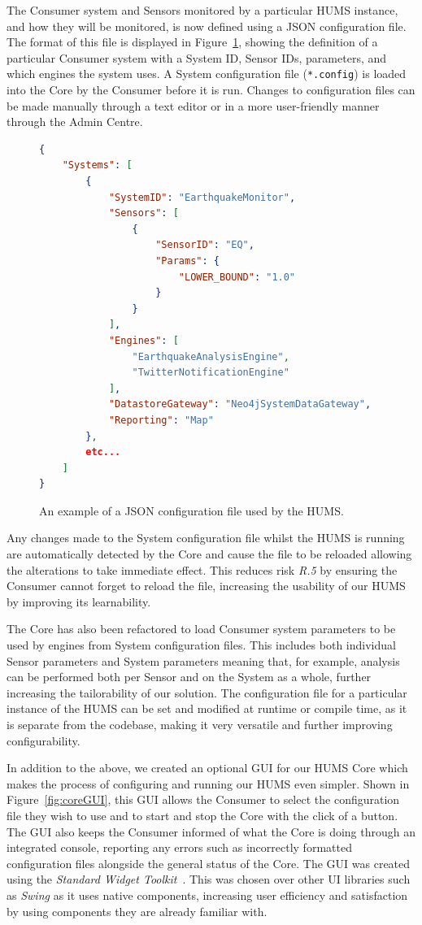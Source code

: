 \documentclass[10pt,a4paper]{article}
\begin{document}
The Consumer system and Sensors monitored by a particular HUMS instance, and how they will be monitored, is now defined using a JSON configuration file. The format of this file is displayed in Figure~\ref{fig:configFiles}, showing the definition of a particular Consumer system with a System ID, Sensor IDs, parameters, and which engines the system uses. A System configuration file (\texttt{*.config}) is loaded into the Core by the Consumer before it is run. Changes to configuration files can be made manually through a text editor or in a more user-friendly manner through the Admin Centre.

\begin{figure}[tbp]
\begin{lstlisting}[language=json,firstnumber=1]
{
    "Systems": [
        {
            "SystemID": "EarthquakeMonitor",
            "Sensors": [
                {
                    "SensorID": "EQ",
                    "Params": {
                        "LOWER_BOUND": "1.0"
                    }
                }
            ],
            "Engines": [
                "EarthquakeAnalysisEngine",
                "TwitterNotificationEngine"
            ],
            "DatastoreGateway": "Neo4jSystemDataGateway",
            "Reporting": "Map"
        },
        etc...
    ]
}
\end{lstlisting}
\caption{An example of a JSON configuration file used by the HUMS.}
\label{fig:configFiles}
\end{figure}

Any changes made to the System configuration file whilst the HUMS is running are automatically detected by the Core and cause the file to be reloaded allowing the alterations to take immediate effect. This reduces risk \emph{R.5} by ensuring the Consumer cannot forget to reload the file, increasing the usability of our HUMS by improving its learnability.

The Core has also been refactored to load Consumer system parameters to be used by engines from System configuration files. This includes both individual Sensor parameters and System parameters meaning that, for example, analysis can be performed both per Sensor and on the System as a whole, further increasing the tailorability of our solution. The configuration file for a particular instance of the HUMS can be set and modified at runtime or compile time, as it is separate from the codebase, making it very versatile and further improving configurability. 

In addition to the above, we created an optional GUI for our HUMS Core which makes the process of configuring and running our HUMS even simpler. Shown in Figure~\ref{fig:coreGUI}, this GUI allows the Consumer to select the configuration file they wish to use and to start and stop the Core with the click of a button. The GUI also keeps the Consumer informed of what the Core is doing through an integrated console, reporting any errors such as incorrectly formatted configuration files alongside the general status of the Core. The GUI was created using the \emph{Standard Widget Toolkit}~\cite{swt}. This was chosen over other UI libraries such as \emph{Swing} as it uses native components, increasing user efficiency and satisfaction by using components they are already familiar with.
\end{document}
